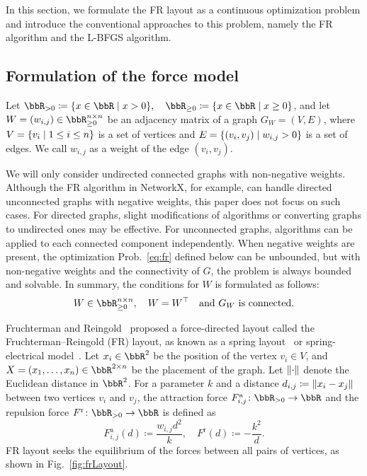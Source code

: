 \documentclass[dvipdfmx,10pt,journal,compsoc]{IEEEtran}
\newcommand{\defeq}{\coloneqq}
\begin{document}
In this section, we formulate the FR layout as a continuous optimization problem and introduce the conventional approaches to this problem, namely the FR algorithm and the L-BFGS algorithm.

\subsection{
  Formulation of the force model
}\label{ssec:forceModel}

Let $\bbR_{> 0} \defeq \qty{ x \in \bbR \mid x > 0 }, \quad \bbR_{\geq 0} \defeq \qty{ x \in \bbR \mid x \geq 0 }$, and let $W = (w_{i,j}) \in \bbR_{\geq 0}^{n \times n}$ be an adjacency matrix of a graph $G_W = (V, E)$, where $V = \qty{v_i \mid 1 \leq i \leq n}$ is a set of vertices and $E = \qty{(v_i, v_j) \mid w_{i,j} > 0}$ is a set of edges. We call $w_{i,j}$ as a weight of the edge $(v_i, v_j)$.

We will only consider undirected connected graphs with non-negative weights.
Although the FR algorithm in NetworkX, for example, can handle directed unconnected graphs with negative weights, this paper does not focus on such cases.
For directed graphs, slight modifications of algorithms or converting graphs to undirected ones may be effective.
For unconnected graphs, algorithms can be applied to each connected component independently.
When negative weights are present, the optimization Prob.~\eqref{eq:fr} defined below can be unbounded, but with non-negative weights and the connectivity of $G$, the problem is always bounded and solvable.
In summary, the conditions for $W$ is formulated as follows:
\begin{equation}\label{eq:WCondition}
  W \in \bbR_{\geq 0}^{n \times n}, \quad W = W^\top \quad \text{and $G_W$ is connected}.
\end{equation}

Fruchterman and Reingold~\cite{fruchtermanGraphDrawingForcedirected1991} proposed a force-directed layout called the Fruchterman--Reingold (FR) layout, as known as a spring layout~\cite{hagberg2008exploring} or spring-electrical model~\cite{Hu2006EfficientHF}.
Let $x_i \in \bbR^2$ be the position of the vertex $v_i \in V$, and $X = (x_1, \dots, x_n) \in \bbR^{2 \times n}$ be the placement of the graph.
Let $\norm{\cdot}$ denote the Euclidean distance in $\bbR^2$. For a parameter $k$ and a distance $d_{i,j} \defeq \norm{x_i - x_j}$ between two vertices $v_i$ and $v_j$, the attraction force $F_{i,j}^\mathrm{a}\colon \bbR_{> 0} \to \bbR$ and the repulsion force $F^\mathrm{r}\colon \bbR_{> 0} \to \bbR$ is defined as
\begin{equation*}
  F_{i,j}^\mathrm{a}(d) \defeq \frac{w_{i,j} d^2}{k}, \quad F^\mathrm{r}(d) \defeq -\frac{k^2}{d}.
\end{equation*}
FR layout seeks the equilibrium of the forces between all pairs of vertices, as shown in Fig.~\ref{fig:frLayout}.
\end{document}

